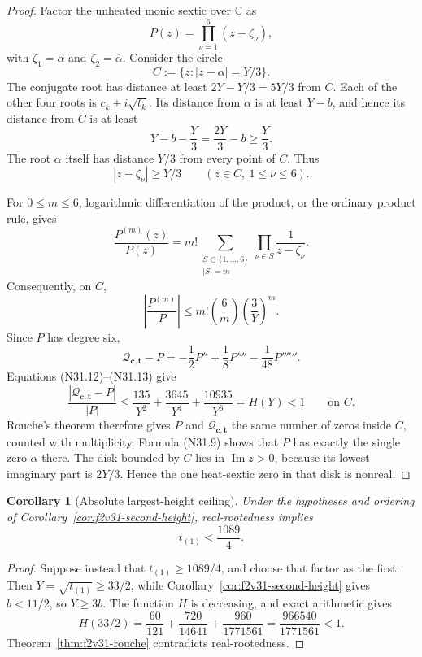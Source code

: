 \documentclass[11pt]{article}
\newtheorem{corollary}[theorem]{Corollary}
\theoremstyle{definition}
\theoremstyle{remark}
\begin{document}
\begin{proof}
Factor the unheated monic sextic over \(\mathbb C\) as
\[
 P(z)=\prod_{\nu=1}^6(z-\zeta_\nu),
 \tag{N31.7}
\]
with \(\zeta_1=\alpha\) and \(\zeta_2=\overline\alpha\).
Consider the circle
\[
 C:=\{z:|z-\alpha|=Y/3\}.
 \tag{N31.8}
\]
The conjugate root has distance at least \(2Y-Y/3=5Y/3\) from
\(C\).  Each of the other four roots is \(c_k\mathbin{\pm}i\sqrt{t_k}\).
Its distance from \(\alpha\) is at least \(Y-b\), and hence its distance
from \(C\) is at least
\[
 Y-b-\frac Y3=\frac{2Y}{3}-b\geq\frac Y3.
 \tag{N31.9}
\]
The root \(\alpha\) itself has distance \(Y/3\) from every point of
\(C\).  Thus
\[
 |z-\zeta_\nu|\geq Y/3\qquad(z\in C,\ 1\leq\nu\leq6).
 \tag{N31.10}
\]

For \(0\leq m\leq6\), logarithmic differentiation of the product,
or the ordinary product rule, gives
\[
 \frac{P^{(m)}(z)}{P(z)}
 =
 m!\!\sum_{\substack{S\subset\{1,\ldots,6\}\\|S|=m}}
 \prod_{\nu\in S}\frac1{z-\zeta_\nu}.
 \tag{N31.11}
\]
Consequently, on \(C\),
\[
 \left|\frac{P^{(m)}}P\right|
 \leq m!\binom6m\left(\frac3Y\right)^m.
 \tag{N31.12}
\]
Since \(P\) has degree six,
\[
 \mathcal Q_{\bm c,\bm t}-P
 =-\frac12P''+\frac18P''''-\frac1{48}P''''''.
 \tag{N31.13}
\]
Equations \textup{(N31.12)}--\textup{(N31.13)} give
\[
 \frac{|\mathcal Q_{\bm c,\bm t}-P|}{|P|}
 \leq\frac{135}{Y^2}+\frac{3645}{Y^4}
       +\frac{10935}{Y^6}=H(Y)<1
 \qquad\text{on }C.
 \tag{N31.14}
\]
Rouche's theorem therefore gives \(P\) and
\(\mathcal Q_{\bm c,\bm t}\) the same number of zeros inside \(C\),
counted with multiplicity.  Formula \textup{(N31.9)} shows that \(P\)
has exactly the single zero \(\alpha\) there.  The disk bounded by \(C\)
lies in \(\operatorname{Im}z>0\), because its lowest imaginary part is
\(2Y/3\).  Hence the one heat-sextic zero in that disk is nonreal.
\end{proof}

\begin{corollary}[Absolute largest-height ceiling]
\label{cor:f2v31-largest-height}
Under the hypotheses and ordering of
Corollary~\ref{cor:f2v31-second-height}, real-rootedness implies
\[
 \boxed{t_{(1)}<\frac{1089}{4}.}
 \tag{N31.15}
\]
\end{corollary}

\begin{proof}
Suppose instead that \(t_{(1)}\geq1089/4\), and choose that factor as
the first.  Then \(Y=\sqrt{t_{(1)}}\geq33/2\), while
Corollary~\ref{cor:f2v31-second-height} gives
\(b<11/2\), so \(Y\geq3b\).  The function \(H\) is decreasing, and
exact arithmetic gives
\[
 H(33/2)
 =\frac{60}{121}+\frac{720}{14641}
  +\frac{960}{1771561}
 =\frac{966540}{1771561}<1.
 \tag{N31.16}
\]
Theorem~\ref{thm:f2v31-rouche} contradicts real-rootedness.
\end{proof}
\end{document}

